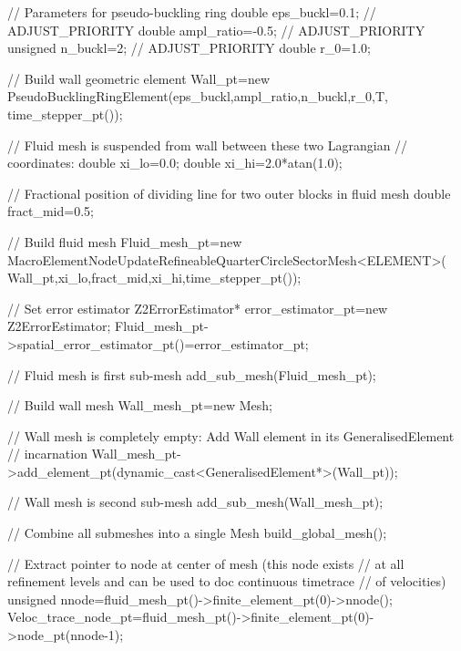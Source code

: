 \begin{DoxyCodeInclude}
 \textcolor{comment}{// Parameters for pseudo-buckling ring }
 \textcolor{keywordtype}{double} eps\_buckl=0.1;  \textcolor{comment}{// ADJUST\_PRIORITY }
 \textcolor{keywordtype}{double} ampl\_ratio=-0.5;  \textcolor{comment}{// ADJUST\_PRIORITY }
 \textcolor{keywordtype}{unsigned} n\_buckl=2; \textcolor{comment}{// ADJUST\_PRIORITY }
 \textcolor{keywordtype}{double} r\_0=1.0;
 
 \textcolor{comment}{// Build wall geometric element}
 Wall\_pt=\textcolor{keyword}{new} PseudoBucklingRingElement(eps\_buckl,ampl\_ratio,n\_buckl,r\_0,T,
                                       time\_stepper\_pt());

 \textcolor{comment}{// Fluid mesh is suspended from wall between these two Lagrangian}
 \textcolor{comment}{// coordinates:}
 \textcolor{keywordtype}{double} xi\_lo=0.0;
 \textcolor{keywordtype}{double} xi\_hi=2.0*atan(1.0);

 \textcolor{comment}{// Fractional position of dividing line for two outer blocks in fluid mesh}
 \textcolor{keywordtype}{double} fract\_mid=0.5;

 \textcolor{comment}{// Build fluid mesh}
 Fluid\_mesh\_pt=\textcolor{keyword}{new} MacroElementNodeUpdateRefineableQuarterCircleSectorMesh<ELEMENT>(
  Wall\_pt,xi\_lo,fract\_mid,xi\_hi,time\_stepper\_pt());

 \textcolor{comment}{// Set error estimator}
 Z2ErrorEstimator* error\_estimator\_pt=\textcolor{keyword}{new} Z2ErrorEstimator;
 Fluid\_mesh\_pt->spatial\_error\_estimator\_pt()=error\_estimator\_pt;
  
 \textcolor{comment}{// Fluid mesh is first sub-mesh}
 add\_sub\_mesh(Fluid\_mesh\_pt);

 \textcolor{comment}{// Build wall mesh }
 Wall\_mesh\_pt=\textcolor{keyword}{new} Mesh;

 \textcolor{comment}{// Wall mesh is completely empty: Add Wall element in its GeneralisedElement}
 \textcolor{comment}{// incarnation}
 Wall\_mesh\_pt->add\_element\_pt(dynamic\_cast<GeneralisedElement*>(Wall\_pt));

 \textcolor{comment}{// Wall mesh is second sub-mesh}
 add\_sub\_mesh(Wall\_mesh\_pt);

 \textcolor{comment}{// Combine all submeshes into a single Mesh}
 build\_global\_mesh();

 \textcolor{comment}{// Extract pointer to node at center of mesh (this node exists}
 \textcolor{comment}{// at all refinement levels and can be used to doc continuous timetrace}
 \textcolor{comment}{// of velocities)}
 \textcolor{keywordtype}{unsigned} nnode=fluid\_mesh\_pt()->finite\_element\_pt(0)->nnode();
 Veloc\_trace\_node\_pt=fluid\_mesh\_pt()->finite\_element\_pt(0)->node\_pt(nnode-1);


\end{DoxyCodeInclude}
